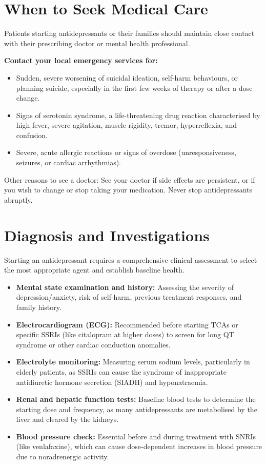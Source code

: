 \section*{When to Seek Medical Care}
Patients starting antidepressants or their families should maintain close contact with their prescribing doctor or mental health professional.

\textbf{Contact your local emergency services for:}
\begin{itemize}
    \item Sudden, severe worsening of suicidal ideation, self-harm behaviours, or planning suicide, especially in the first few weeks of therapy or after a dose change.
    \item Signs of serotonin syndrome, a life-threatening drug reaction characterised by high fever, severe agitation, muscle rigidity, tremor, hyperreflexia, and confusion.
    \item Severe, acute allergic reactions or signs of overdose (unresponsiveness, seizures, or cardiac arrhythmias).
\end{itemize}
Other reasons to see a doctor: See your doctor if side effects are persistent, or if you wish to change or stop taking your medication. Never stop antidepressants abruptly.

\section*{Diagnosis and Investigations}
Starting an antidepressant requires a comprehensive clinical assessment to select the most appropriate agent and establish baseline health.
\begin{itemize}
    \item \textbf{Mental state examination and history:} Assessing the severity of depression/anxiety, risk of self-harm, previous treatment responses, and family history.
    \item \textbf{Electrocardiogram (ECG):} Recommended before starting TCAs or specific SSRIs (like citalopram at higher doses) to screen for long QT syndrome or other cardiac conduction anomalies.
    \item \textbf{Electrolyte monitoring:} Measuring serum sodium levels, particularly in elderly patients, as SSRIs can cause the syndrome of inappropriate antidiuretic hormone secretion (SIADH) and hyponatraemia.
    \item \textbf{Renal and hepatic function tests:} Baseline blood tests to determine the starting dose and frequency, as many antidepressants are metabolised by the liver and cleared by the kidneys.
    \item \textbf{Blood pressure check:} Essential before and during treatment with SNRIs (like venlafaxine), which can cause dose-dependent increases in blood pressure due to noradrenergic activity.
\end{itemize}


